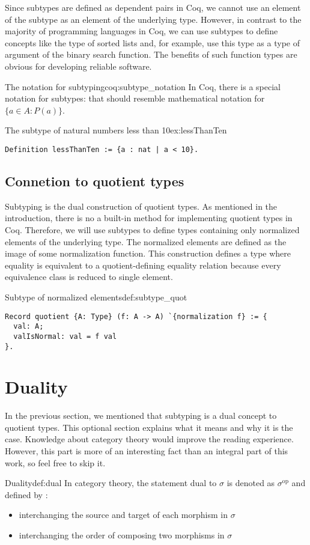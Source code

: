 Since subtypes are defined as dependent pairs in Coq, we cannot use an element of the subtype as an element of the underlying type. However, in contrast to the majority of programming languages in Coq, we can use subtypes to define concepts like the type of sorted lists and, for example, use this type as a type of argument of the binary search function. The benefits of such function types are obvious for developing reliable software.
\begin{coq}{The notation for subtyping}{coq:subtype_notation}
In Coq, there is a special notation for subtypes:  that should resemble mathematical notation for $\{a \in A: P(a)\}$.
\end{coq}
\begin{example}{The subtype of natural numbers less than 10}{ex:lessThanTen}
\begin{verbatim}
Definition lessThanTen := {a : nat | a < 10}.
\end{verbatim}
\end{example}
\subsection{Connetion to quotient types}
Subtyping is the dual construction of quotient types. As mentioned in the introduction, there is no a built-in method for implementing quotient types in Coq. Therefore, we will use subtypes to define types containing only normalized elements of the underlying type. The normalized elements are defined as the image of some normalization function. This construction defines a type where equality is equivalent to a quotient-defining equality relation because every equivalence class is reduced to single element.
\begin{defi}{Subtype of normalized elements}{def:subtype_quot}
\begin{verbatim}
Record quotient {A: Type} (f: A -> A) `{normalization f} := {
  val: A;
  valIsNormal: val = f val
}.
\end{verbatim}
\end{defi}
\section{Duality}
In the previous section, we mentioned that subtyping is a dual concept to quotient types. This optional section explains what it means and why it is the case. Knowledge about category theory would improve the reading experience. However, this part is more of an interesting fact than an integral part of this work, so feel free to skip it.
\begin{defi}[]{Duality}{def:dual}
In category theory, the statement dual to $\sigma$ is denoted as $\sigma^{\textrm{op}}$ and defined by \cite{CategoryTheory}:
\begin{itemize}
    \itemsep 0em 
    \item interchanging the source and target of each morphism in $\sigma$
    \item interchanging the order of composing two morphisms in $\sigma$ 
\end{itemize}
\end{defi}

